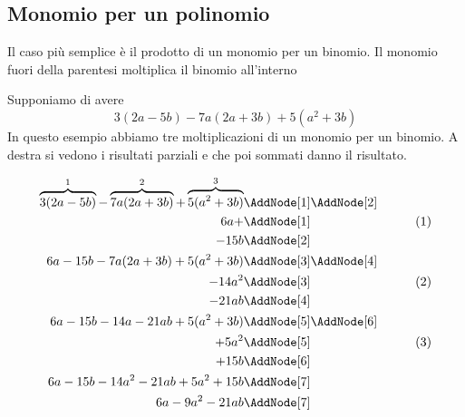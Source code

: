 \subsection{Monomio per un polinomio}
Il caso più semplice è il prodotto di un monomio per un binomio. Il monomio fuori della parentesi moltiplica il binomio all'interno
\begin{center}

\end{center}
\begin{esempio}
Supponiamo di avere \[3(2a-5b)-7a(2a+3b)+5(a^2+3b)\]
In questo esempio abbiamo tre moltiplicazioni di un monomio per un binomio. A destra si vedono i risultati parziali e che poi sommati danno il risultato.
\begin{NodesList}
	\begin{align*}
		\overbrace{3(2a-5b)}^{1}-\overbrace{7a(2a+3b)}^{2}+\overbrace{5(a^2+3b)}^{3}&\AddNode[1]\AddNode[2]\\
		6a+&\AddNode[1]&\tag{1}\\ 
		-15b&\AddNode[2]&\\
		6a-15b-7a(2a+3b)+5(a^2+3b)&\AddNode[3]\AddNode[4]\\
		-14a^2&\AddNode[3]&\tag{2}\\    
		-21ab&\AddNode[4]&\\
		6a-15b-14a-21ab+5(a^2+3b)&\nonumber\AddNode[5]\AddNode[6]\\
		+5a^2&\AddNode[5]&\tag{3}\\
		+15b&\AddNode[6]&\\
		6a-15b-14a^2-21ab+5a^2+15b&\nonumber\AddNode[7]&\\   
		6a-9a^2-21ab&\nonumber\AddNode[7] 
	\end{align*}
\end{NodesList}
\end{esempio}
